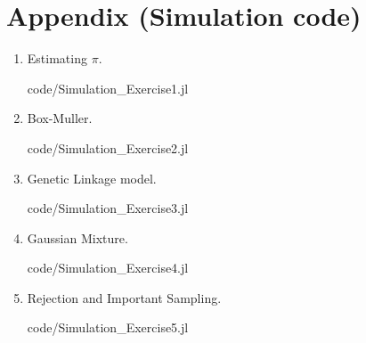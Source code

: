 \documentclass[12pt,letterpaper]{article}
\begin{document}
\section*{Appendix (Simulation code)}
\begin{enumerate}[leftmargin=!,labelindent=5pt]
	\item Estimating $\pi$.
        
        {code/Simulation_Exercise1.jl}

	\newpage
	\item Box-Muller.
        
        {code/Simulation_Exercise2.jl}

	\newpage
	\item Genetic Linkage model.
        
        {code/Simulation_Exercise3.jl}

	\newpage
	\item Gaussian Mixture.
        
        {code/Simulation_Exercise4.jl}

	\newpage
	\item Rejection and Important Sampling.
        
        {code/Simulation_Exercise5.jl}


\end{enumerate}
\end{document}
